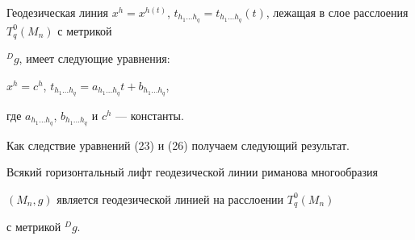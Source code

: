 \begin{thm}


Геодезическая линия $x^h=x^{h(t)}$, $t_{h_1\dotsc h_q}=t_{h_1\dotsc


h_q}(t)$, лежащая в слое расслоения  $T^0_q(M_n)$ с метрикой


${}^{D}g$, имеет следующие уравнения\/${:}$


$x^h=c^h$, $t_{h_1\dotsc h_q}=


a_{h_1\dotsc h_q}t+b_{h_1\dotsc h_q}$,


где $a_{h_1\dotsc h_q}$, $b_{h_1\dotsc h_q}$ и $c^h$ --- константы.


\end{thm}





Как следствие уравнений (23) и (26) получаем следующий результат.





\begin{thm}


Всякий горизонтальный лифт геодезической линии риманова многообразия


$(M_n,g)$ является геодезической линией на расслоении $T^0_q(M_n)$


с метрикой ${}^{D}g$.


\end{thm}





